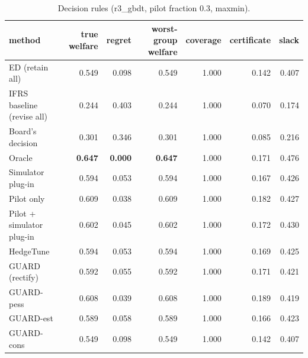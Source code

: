 \begin{table}[t]
\centering
\small
\begin{tabular}{lrrrrrr}
\toprule
method & true welfare & regret & worst-group welfare & coverage & certificate & slack \\
\midrule
ED (retain all) & 0.549 & 0.098 & 0.549 & 1.000 & 0.142 & 0.407 \\
IFRS baseline (revise all) & 0.244 & 0.403 & 0.244 & 1.000 & 0.070 & 0.174 \\
Board's decision & 0.301 & 0.346 & 0.301 & 1.000 & 0.085 & 0.216 \\
Oracle & \textbf{0.647} & \textbf{0.000} & \textbf{0.647} & 1.000 & 0.171 & 0.476 \\
Simulator plug-in & 0.594 & 0.053 & 0.594 & 1.000 & 0.167 & 0.426 \\
Pilot only & 0.609 & 0.038 & 0.609 & 1.000 & 0.182 & 0.427 \\
Pilot + simulator plug-in & 0.602 & 0.045 & 0.602 & 1.000 & 0.172 & 0.430 \\
HedgeTune & 0.594 & 0.053 & 0.594 & 1.000 & 0.169 & 0.425 \\
GUARD (rectify) & 0.592 & 0.055 & 0.592 & 1.000 & 0.171 & 0.421 \\
GUARD-pess & 0.608 & 0.039 & 0.608 & 1.000 & 0.189 & 0.419 \\
GUARD-est & 0.589 & 0.058 & 0.589 & 1.000 & 0.166 & 0.423 \\
GUARD-cons & 0.549 & 0.098 & 0.549 & 1.000 & 0.142 & 0.407 \\
\bottomrule
\end{tabular}
\caption{Decision rules (r3\_gbdt, pilot fraction 0.3, maxmin).}
\label{tab:methods-maxmin}
\end{table}
